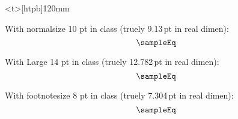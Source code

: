 \clearpage
\begin{minipage}<t>[htpb]{120mm}
		\vspace*{10mm}
			{\normalsize With normalsize 10 pt in class (truely 9.13\,pt in real dimen):
				\[ \sampleEq \]\par}

			{\Large With Large 14 pt in class (truely 12.782\,pt in real dimen):
				\[ \sampleEq \]\par}

			{\footnotesize With footnotesize 8 pt in class (truely 7.304\,pt in real dimen):
				\[ \sampleEq \]\par}
\end{minipage}


\endinput